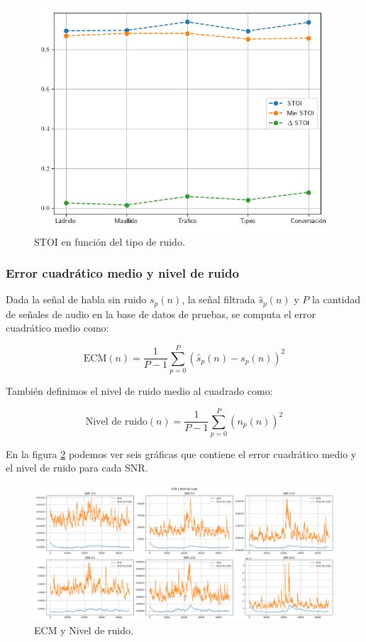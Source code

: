 \begin{figure}
	\centering
	\centerline{\includegraphics[scale=0.75]{images/ch6/af_metric_STOI_noises.png}}
	\caption{STOI en función del tipo de ruido.}
	\label{fig:ch6_stoi_resume_by_noise}
\end{figure} 

\subsubsection{Error cuadrático medio y nivel de ruido}

Dada la señal de habla sin ruido $s_p(n)$, la señal filtrada $\hat{s}_p(n)$ y $P$ la cantidad de señales de audio en la base de datos de pruebas, se computa el error cuadrático medio como:

\begin{equation*}
	\text{ECM}(n) = \frac{1}{P-1} \sum_{p=0}^{P} (\hat{s}_p(n) - s_p(n))^2
\end{equation*}

También definimos el nivel de ruido medio al cuadrado como:

\begin{equation*}
	\text{Nivel de ruido}(n) = \frac{1}{P-1} \sum_{p=0}^{P} (n_p(n))^2
\end{equation*}

En la figura \ref{fig:ch6_mse_and_noise_level} podemos ver seis gráficas que contiene el error cuadrático medio y el nivel de ruido para cada SNR.

\begin{figure}
	\centering
	\centerline{\includegraphics[scale=0.35]{images/ch6/af/mse_and_noise_level.png}}
	\caption{ECM y Nivel de ruido.}
	\label{fig:ch6_mse_and_noise_level}
\end{figure}

